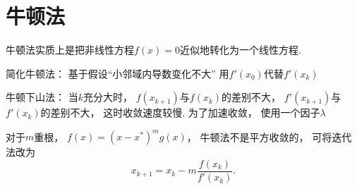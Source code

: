 \section{牛顿法}

牛顿法实质上是把非线性方程\(f(x) = 0\)近似地转化为一个线性方程.

简化牛顿法：
基于假设“小邻域内导数变化不大”
用\(f'(x_0)\)代替\(f'(x_k)\)

牛顿下山法：
当\(k\)充分大时，
\(f(x_{k+1})\)与\(f(x_k)\)的差别不大，
\(f'(x_{k+1})\)与\(f'(x_k)\)的差别不大，
这时收敛速度较慢.
为了加速收敛，
使用一个因子\(\lambda\)


对于\(m\)重根，
\(f(x) = (x - x^*)^m g(x)\)，
牛顿法不是平方收敛的，
可将迭代法改为
\begin{equation*}
	x_{k+1} = x_k - m \frac{f(x_k)}{f'(x_k)}.
\end{equation*}

